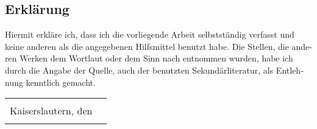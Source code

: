\begin{otherlanguage}{ngerman}
	\chapter{Erklärung}

	Hiermit erkläre ich, dass ich die vorliegende Arbeit selbstständig verfasst und keine anderen als die angegebenen Hilfsmittel benutzt habe.
	Die Stellen, die anderen Werken dem Wortlaut oder dem Sinn nach entnommen wurden, habe ich durch die Angabe der Quelle, auch der benutzten Sekundärliteratur, als Entlehnung kenntlich gemacht.
	
	\vspace{3em}
	\begin{center}
	\begin{tabular}{cc}
		                                     & \hspace{5cm}    \\
		Kaiserslautern, den \submissiondateDE   & \hrulefill      \\
		                                     & \TheAuthor
	\end{tabular}
	\end{center}
\end{otherlanguage}
